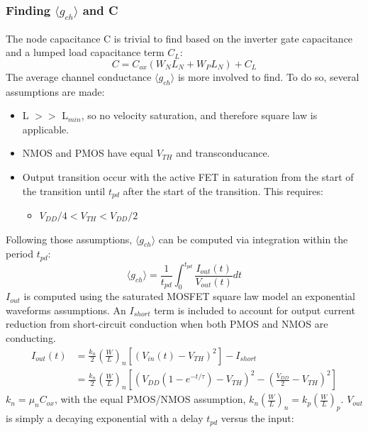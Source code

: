 		\subsubsection{Finding $\langle g_{ch}\rangle$ and C}
			The node capacitance C is trivial to find based on the inverter gate capacitance and a lumped load capacitance term $C_L$:
			\begin{equation}
				C = C_{ox}\left ( W_N L_N + W_P L_N \right) + C_L
			\end{equation}
			The average channel conductance $\langle g_{ch} \rangle$ is more involved to find. To do so, several assumptions are made:
			\begin{itemize}
				\item L $>>$ L$_{min}$, so no velocity saturation, and therefore square law is applicable.
				\item NMOS and PMOS have equal $V_{TH}$ and transconducance.
				\item Output transition occur with the active FET in saturation from the start of the transition until $t_{pd}$ after the start of the transition. This requires:
				\begin{itemize}
					\item $V_{DD}/4 < V_{TH} < V_{DD}/2$
				\end{itemize}
			\end{itemize}
			Following those assumptions, $\langle g_{ch} \rangle$ can be computed via integration within the period $t_{pd}$:
			\begin{equation}
				\langle g_{ch} \rangle = \frac{1}{t_{pd}} \int_0^{t_{pd}}\frac{I_{out}(t)}{V_{out}(t)}dt
			\end{equation}
			$I_{out}$ is computed using the saturated MOSFET square law model an exponential waveforms assumptions. An $I_{short}$ term is included to account for output current reduction from short-circuit conduction when both PMOS and NMOS are conducting.
			\begin{align}
				I_{out}(t) &= \frac{k_n}{2}\left(\frac{W}{L}\right)_n\left[\left(V_{in}(t) - V_{TH}\right)^2 \right]  - I_{short} \\
				&= \frac{k_n}{2}\left(\frac{W}{L}\right)_n \left[\left(V_{DD}\left(1-e^{-t/\tau}\right) - V_{TH}\right)^2 - \left(\frac{V_{DD}}{2} -V_{TH}\right)^2\right]
			\end{align}
			$k_n = \mu_nC_{ox}$, with the equal PMOS/NMOS assumption, $k_n\left(\frac{W}{L}\right)_n=k_p\left(\frac{W}{L}\right)_p$. $V_{out}$ is simply a decaying exponential with a delay $t_{pd}$ versus the input:
